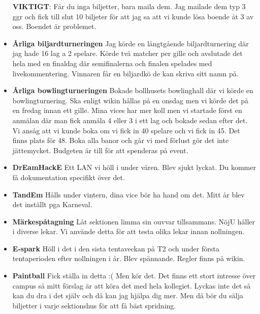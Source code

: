 \documentclass[10pt]{article}
\begin{document}
\begin{itemize}
        \textbf{VIKTIGT}: Får du inga biljetter, bara maila dem. Jag mailade dem typ 3 ggr och fick till slut 10 biljeter för att jag sa att vi kunde lösa boende åt 3 av oss. Boendet är problemet.
        
        \item \textbf{Årliga biljardturneringen} \newline Jag körde en långtgående biljardturnering där jag hade 16 lag a 2 spelare. Körde två matcher per gille och avslutade det hela med en finaldag där semifinalerna och finalen spelades med livekommentering. Vinnaren får en biljardkö de kan skriva sitt namn på.
        \item \textbf{Årliga bowlingturneringen} \newline Bokade bollhusets bowlinghall där vi körde en bowlingturnering. Ska enligt wikin hållas på en onsdag men vi körde det på en fredag innan ett gille. Mina vices har mer koll men vi startade först en anmälan där man fick anmäla 4 eller 3 i ett lag och bokade sedan efter det. Vi ansåg att vi kunde boka om vi fick in 40 spelare och vi fick in 45. Det finns plats för 48. Boka alla banor och går vi med förlust gör det inte jättemycket. Budgeten är till för att spenderas på event.
        \item \textbf{DrEamHackE} \newline Ett LAN vi höll i under våren. Blev sjukt lyckat. Du kommer få dokumentation specifikt över det.
        \item \textbf{TandEm} \newline Hålls under vintern, dina vice bör ha hand om det. Mitt år blev det inställt pga Karneval.
        \item \textbf{Märkespåtagning} \newline Låt sektionen limma sin ouvvar tillsammans. NöjU håller i diverse lekar. Vi använde detta för att testa olika lekar innan nollningen.
        \item \textbf{E-spark} \newline Höll i det i den sista tentaveckan på T2 och under första tentaperioden efter nollningen i år. Blev spännande. Regler finns på wikin.
        \item \textbf{Paintball} \newline Fick ställa in detta :( Men kör det. Det finns ett stort intresse över campus så mitt förslag är att köra det med hela kollegiet. Lyckas inte det så kan du dra i det själv och då kan jag hjälpa dig mer. Men då bör du sälja biljetter i varje sektionshus för att få bäst spridning.

\end{itemize}
\end{document}

